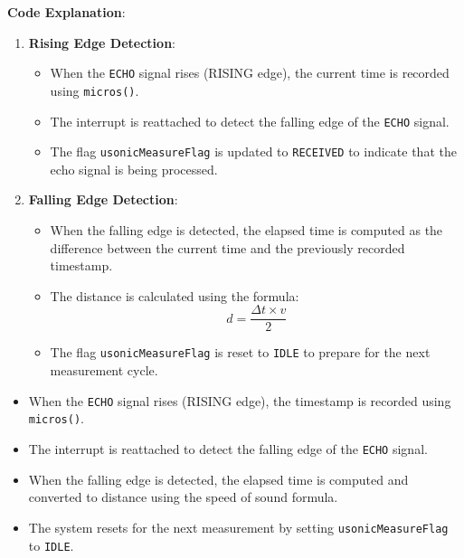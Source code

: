 \textbf{Code Explanation}:
\begin{enumerate}
	\item \textbf{Rising Edge Detection}:
	\begin{itemize}
		\item When the \texttt{ECHO} signal rises (RISING edge), the current time is recorded using \texttt{micros()}.
		\item The interrupt is reattached to detect the falling edge of the \texttt{ECHO} signal.
		\item The flag \texttt{usonicMeasureFlag} is updated to \texttt{RECEIVED} to indicate that the echo signal is being processed.
	\end{itemize}
	\item \textbf{Falling Edge Detection}:
	\begin{itemize}
		\item When the falling edge is detected, the elapsed time is computed as the difference between the current time and the previously recorded timestamp.		
		\item The distance is calculated using the formula:
		\begin{equation}
			d = \frac{ \Delta t \times v}{2}
		\end{equation}
		\item The flag \texttt{usonicMeasureFlag} is reset to \texttt{IDLE} to prepare for the next measurement cycle.
	\end{itemize}				
\end{enumerate}

\begin{itemize}
	\item When the \texttt{ECHO} signal rises (RISING edge), the timestamp is recorded using \texttt{micros()}.
	\item The interrupt is reattached to detect the falling edge of the \texttt{ECHO} signal.
	\item When the falling edge is detected, the elapsed time is computed and converted to distance using the speed of sound formula.
	\item The system resets for the next measurement by setting \texttt{usonicMeasureFlag} to \texttt{IDLE}.
\end{itemize}


